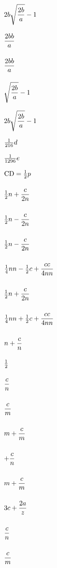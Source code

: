 $2b\sqrt{{\displaystyle\strut 2b\over \displaystyle\strut a}} - 1$\par\vfill\eject
${\displaystyle\strut 2bb\over \displaystyle\strut a}$\par\vfill\eject
${\displaystyle\strut 2bb\over \displaystyle\strut a}$\par\vfill\eject
$\sqrt{{\displaystyle\strut 2b\over \displaystyle\strut a}} - 1$\par\vfill\eject
$2b\sqrt{{\displaystyle\strut 2b\over \displaystyle\strut a}} - 1$\par\vfill\eject
${1\over 216} d$\par\vfill\eject
${1\over 1296} e$\par\vfill\eject
${\rm CD} = {{1\over 2}}p$\par\vfill\eject
${{1\over 2}}n + {{\displaystyle\strut c\over \displaystyle\strut 2n}}$\par\vfill\eject
${{1\over 2}}n - {{\displaystyle\strut c\over \displaystyle\strut 2n}}$\par\vfill\eject
${{1\over 2}}n - {{\displaystyle\strut c\over \displaystyle\strut 2n}}$\par\vfill\eject
${{1\over 4}}nn - {{1\over 2}}c + {{\displaystyle\strut cc\over \displaystyle\strut 4nn}}$\par\vfill\eject
${{1\over 2}}n + {{\displaystyle\strut c\over \displaystyle\strut 2n}}$\par\vfill\eject
${{1\over 4}}nn + {{1\over 2}}c + {{\displaystyle\strut cc\over \displaystyle\strut 4nn}}$\par\vfill\eject
$n + {\displaystyle\strut c\over \displaystyle\strut n}$\par\vfill\eject
${1\over 2}$\par\vfill\eject
${\displaystyle\strut c\over \displaystyle\strut n}$\par\vfill\eject
${\displaystyle\strut c\over \displaystyle\strut m}$\par\vfill\eject
$m + {\displaystyle\strut c\over \displaystyle\strut m}$\par\vfill\eject
$+ {\displaystyle\strut c\over \displaystyle\strut n}$\par\vfill\eject
$m + {\displaystyle\strut c\over \displaystyle\strut m}$\par\vfill\eject
$3c + {\displaystyle\strut 2a\over \displaystyle\strut z}$\par\vfill\eject
${\displaystyle\strut c\over \displaystyle\strut n}$\par\vfill\eject
${\displaystyle\strut c\over \displaystyle\strut m}$\par\vfill\eject
